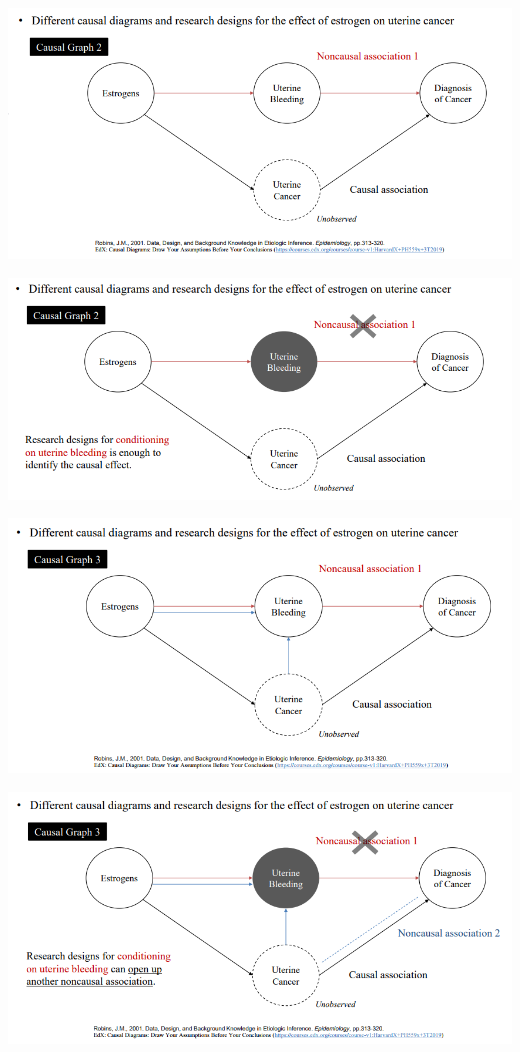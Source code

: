 \documentclass[
]{book}
\theoremstyle{definition}
\theoremstyle{definition}
\theoremstyle{definition}
\theoremstyle{definition}
\theoremstyle{remark}
\begin{document}
\includegraphics{figures/42.png}

\includegraphics{figures/43.png}

\includegraphics{figures/44.png}

\includegraphics{figures/45.png}
\end{document}
